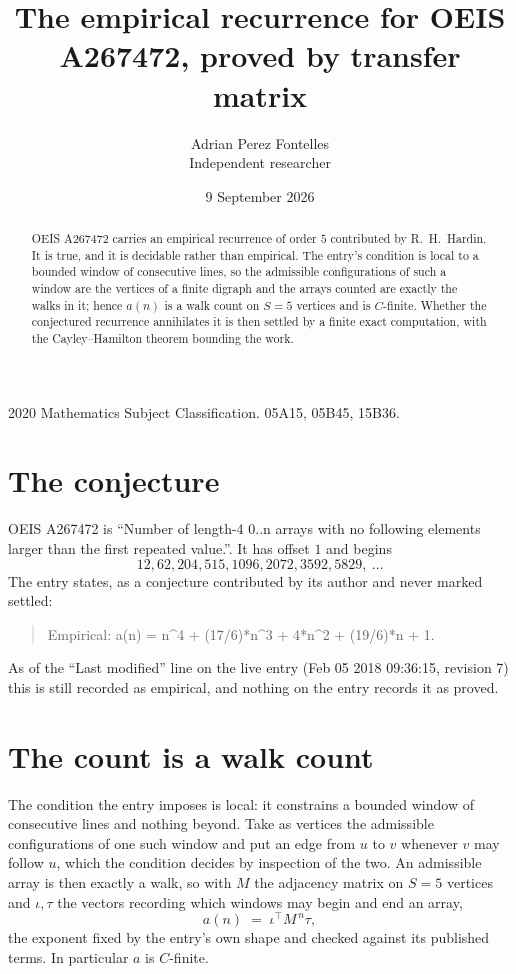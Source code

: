 \documentclass[11pt,a4paper]{article}
\title{The empirical recurrence for OEIS A267472, proved by transfer matrix}
\author{Adrian Perez Fontelles\\ \small Independent researcher}
\date{9 September 2026}
\theoremstyle{plain}
\theoremstyle{definition}
\begin{document}
\maketitle

\begin{abstract}
OEIS A267472 carries an empirical recurrence of order $5$ contributed by R.~H.~Hardin. It is
true, and it is decidable rather than empirical. The entry's condition is local to a bounded window of consecutive lines, so
the admissible configurations of such a window are the vertices of a finite digraph and the
arrays counted are exactly the walks in it; hence $a(n)$ is a walk count on $S=5$ vertices
and is $C$-finite. Whether the conjectured recurrence annihilates it is then settled by a
finite exact computation, with the Cayley--Hamilton theorem bounding the work.
\end{abstract}

\noindent\small 2020 Mathematics Subject Classification. 05A15, 05B45, 15B36.\normalsize

\section{The conjecture}

OEIS A267472 is ``Number of length-4 0..n arrays with no following elements larger than the first repeated value.''. It has offset $1$ and begins
\[
12, 62, 204, 515, 1096, 2072, 3592, 5829,\ \dots
\]
The entry states, as a conjecture contributed by its author and never marked settled:
\begin{quote}
Empirical: a(n) = n\^{}4 + (17/6)*n\^{}3 + 4*n\^{}2 + (19/6)*n + 1.
\end{quote}
As of the ``Last modified'' line on the live entry (Feb 05 2018 09:36:15, revision 7) this is still
recorded as empirical, and nothing on the entry records it as proved.

\section{The count is a walk count}

The condition the entry imposes is local: it constrains a bounded window of consecutive lines and nothing beyond. Take as
vertices the admissible configurations of one such window and put an edge from $u$ to $v$
whenever $v$ may follow $u$, which the condition decides by inspection of the two. An
admissible array is then exactly a walk, so with $M$ the adjacency matrix on $S=5$ vertices
and $\iota,\tau$ the vectors recording which windows may begin and end an array,
\[
a(n)\;=\;\iota^{\!\top}M^{\,n}\tau ,
\]
the exponent fixed by the entry's own shape and checked against its published terms. In
particular $a$ is $C$-finite.
\end{document}
